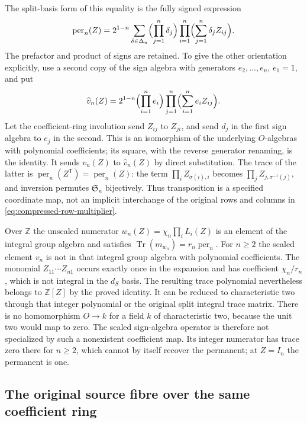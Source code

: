 The split-basis form of this equality is the fully signed expression
\[
 \operatorname{per}_n(Z)=2^{1-n}
 \sum_{\delta\in\Delta_n}
 \Bigl(\prod_{j=1}^n\delta_j\Bigr)
 \prod_{i=1}^n\Bigl(\sum_{j=1}^n\delta_j Z_{ij}\Bigr).
\]
The prefactor and product of signs are retained. To give the other
orientation explicitly, use a second copy of the sign algebra with
generators $e_2,\ldots,e_n$, $e_1=1$, and put
\[
 \widehat v_n(Z)=2^{1-n}
 \Bigl(\prod_{i=1}^n e_i\Bigr)
 \prod_{j=1}^n\Bigl(\sum_{i=1}^n e_i Z_{ij}\Bigr).
\]
Let the coefficient-ring involution send $Z_{ij}$ to $Z_{ji}$,
and send $d_j$ in the first sign algebra to $e_j$ in the second.
This is an isomorphism of the underlying $O$-algebras with polynomial
coefficients; its square, with the reverse generator renaming, is
the identity. It sends $v_n(Z)$ to $\widehat v_n(Z)$ by direct
substitution. The trace of the latter is
$\operatorname{per}_n(Z^{\mathsf T})=\operatorname{per}_n(Z)$:
the term $\prod_i Z_{\sigma(i),i}$ becomes
$\prod_j Z_{j,\sigma^{-1}(j)}$, and inversion permutes
$\mathfrak S_n$ bijectively. Thus transposition is a specified
coordinate map, not an implicit interchange of the original rows
and columns in \eqref{eq:compressed-row-multiplier}.

Over $\mathbb Z$ the unscaled numerator
$w_n(Z)=\chi_n\prod_iL_i(Z)$ is an element of the integral group
algebra and satisfies $\operatorname{Tr}(m_{w_n})=r_n\operatorname{per}_n$.
For $n\ge2$ the scaled element $v_n$ is not in that integral
group algebra with polynomial coefficients. The monomial
$Z_{11}\cdots Z_{n1}$ occurs exactly once in the expansion and has
coefficient $\chi_n/r_n$, which is not integral in the $d_S$ basis.
The resulting trace polynomial nevertheless belongs to $\mathbb Z[Z]$
by the proved identity. It can be reduced to characteristic two
through that integer polynomial or the original split integral trace
matrix. There is no homomorphism $O\to k$ for a field $k$ of
characteristic two, because the unit two would map to zero.
The scaled sign-algebra operator is therefore not specialized by
such a nonexistent coefficient map. Its integer numerator has trace
zero there for $n\ge2$, which cannot by itself recover the permanent;
at $Z=I_n$ the permanent is one.

\subsection{The original source fibre over the same coefficient ring}

